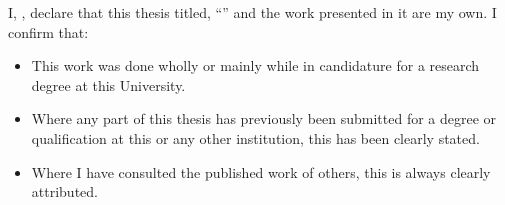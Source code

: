 \documentclass[
12pt,
english,
onehalfspacing,
headsepline,
draft,  %
]{MastersDoctoralThesis}
\begin{document}

\begin{singlespacing}

\begin{declaration}
\addchaptertocentry{\authorshipname}

\noindent I, \authorname, declare that this thesis titled, \enquote{\ttitle} and the work presented in it are my own. I confirm that:

\begin{itemize} 
\item This work was done wholly or mainly while in candidature for a research degree at this University.
\item Where any part of this thesis has previously been submitted for a degree or qualification at this or any other institution, this has been clearly stated.
\item Where I have consulted the published work of others, this is always clearly attributed.
\end{itemize}

\end{declaration}

\end{singlespacing}

\end{document}
